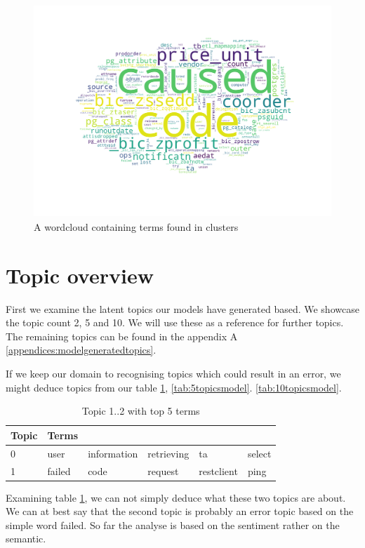  \begin{figure}[h]
    \centering
    \includegraphics[width=15cm, height=8cm]{figures/wc.png}
    \caption{A wordcloud containing terms found in clusters}
    \label{fig:worldcloud}
\end{figure}

\FloatBarrier

\section{Topic overview}\label{results:topics}
First we examine the latent topics our models have generated based. We showcase the topic count 2, 5 and 10. We will use these as a reference for further topics. 
The remaining topics can be found in the appendix A \ref{appendices:modelgeneratedtopics}. 

If we keep our domain to recognising topics which could result in an error, we might deduce topics from our table \ref{tab:2topicsmodel}, \ref{tab:5topicsmodel}. \ref{tab:10topicsmodel}. 

\begin{table}[h]
\centering
\begin{tabular}{|l|l|l|l|l|l|}
 \hline
 Topic & Terms & & & & \\
 \hline
 \hline
 0 & user & information & retrieving & ta & select\\ 
 \hline 
 1 & failed & code & request & restclient & ping\\ 
 \hline 
\end{tabular}
\caption{Topic 1..2 with top 5 terms}
\label{tab:2topicsmodel}
\end{table}

Examining table \ref{tab:2topicsmodel}, we can not simply deduce what these two topics are about. We can at best say that the second topic is probably an error topic based on the simple word failed. So far the analyse is based on the sentiment rather on the semantic.


